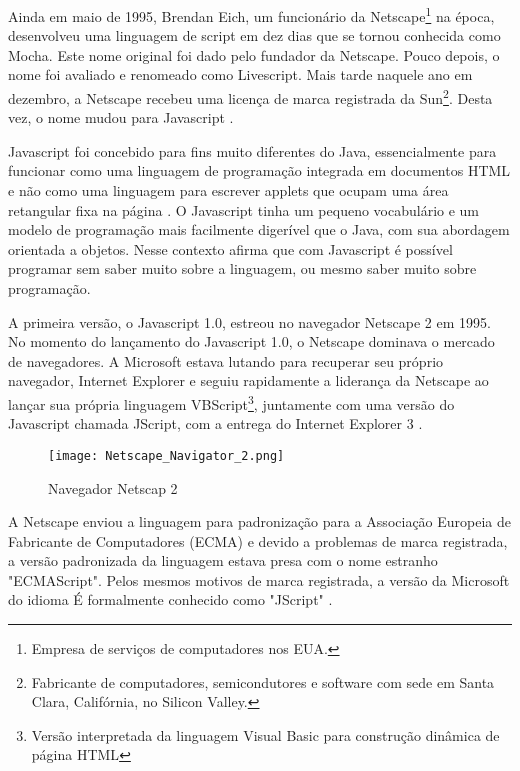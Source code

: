 Ainda em maio de 1995, Brendan Eich, um funcionário da Netscape\footnote{Empresa de serviços de computadores nos EUA.} na época, desenvolveu uma linguagem de script em dez dias que se tornou conhecida como Mocha. Este nome original foi dado pelo fundador da Netscape. Pouco depois, o nome foi avaliado e renomeado como Livescript. Mais tarde naquele ano em dezembro, a Netscape recebeu uma licença de marca registrada da Sun\footnote{Fabricante de computadores, semicondutores e software com sede em Santa Clara, Califórnia, no Silicon Valley.}. Desta vez, o nome mudou para Javascript \cite{neer2013history}.

Javascript foi concebido para fins muito diferentes do Java, essencialmente para funcionar como uma linguagem de programação integrada em documentos HTML e não como uma linguagem para escrever applets que ocupam uma área retangular fixa na página \cite{goodman2007javascript}. O Javascript tinha um pequeno vocabulário e um modelo de programação mais facilmente digerível que o Java, com sua abordagem orientada a objetos. Nesse contexto  afirma que com Javascript é possível programar sem saber muito sobre a linguagem, ou mesmo saber muito sobre programação.

A primeira versão, o Javascript 1.0, estreou no navegador Netscape 2 em 1995. No momento do lançamento do Javascript 1.0, o Netscape dominava o mercado de navegadores. A Microsoft estava lutando para recuperar seu próprio navegador, Internet Explorer e seguiu rapidamente a liderança da Netscape ao lançar sua própria linguagem VBScript\footnote{Versão interpretada da linguagem Visual Basic para construção dinâmica de página HTML}, juntamente com uma versão do Javascript chamada JScript, com a entrega do Internet Explorer 3 \cite{keith2010dom}.

\begin{figure}[!htb]
	\centering
	\texttt{[image: Netscape\_Navigator\_2.png]}
	\caption{Navegador Netscap 2}
	\label{fig:netscape}
\end{figure}

A Netscape enviou a linguagem para padronização para a Associação Europeia de Fabricante de Computadores (ECMA) e devido a problemas de marca registrada, a versão padronizada da linguagem estava presa com o nome estranho "ECMAScript". Pelos mesmos motivos de marca registrada, a versão da Microsoft do idioma É formalmente conhecido como "JScript" \cite{flanagan2011javascript}.

